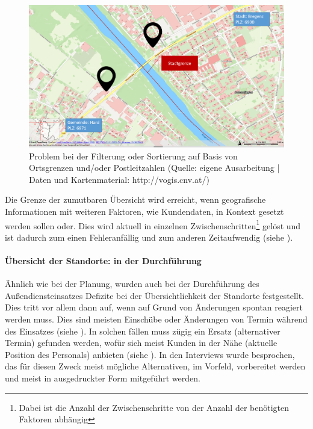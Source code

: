 \documentclass[Bachelorarbeit.tex]{subfiles}
\begin{document}
\begin{figure}[h]
\centering
\includegraphics[width=1\linewidth]{img/Interviews/HarteGrenzen}
\caption[Probleme mit harten Grenzen]{Problem bei der Filterung oder Sortierung auf Basis von Ortsgrenzen und/oder Postleitzahlen (Quelle: eigene Ausarbeitung | Daten und Kartenmaterial: http://vogis.cnv.at/)}
\label{fig:HarteGrenzen}
\end{figure}

Die Grenze der zumutbaren Übersicht wird erreicht, wenn geografische Informationen mit weiteren Faktoren, wie Kundendaten, in Kontext gesetzt werden sollen oder. 
Dies wird aktuell in einzelnen Zwischenschritten\footnote{Dabei ist die Anzahl der Zwischenschritte von der Anzahl der benötigten Faktoren abhängig} gelöst und ist dadurch zum einen Fehleranfällig und zum anderen Zeitaufwendig (siehe ).

\paragraph{Übersicht der Standorte: in der Durchführung}
Ähnlich wie bei der Planung, wurden auch bei der Durchführung des Außendiensteinsatzes Defizite bei der Übersichtlichkeit der Standorte festgestellt. 
Dies tritt vor allem dann auf, wenn auf Grund von Änderungen spontan reagiert werden muss.
Dies sind meisten Einschübe oder Änderungen von Termin während des Einsatzes (siehe ). 
In solchen fällen muss zügig ein Ersatz (alternativer Termin) gefunden werden, wofür sich meist Kunden in der Nähe (aktuelle Position des Personals) anbieten (siehe ).
In den Interviews wurde besprochen, das für diesen Zweck meist mögliche Alternativen, im Vorfeld, vorbereitet werden und meist in ausgedruckter Form mitgeführt werden. 
\end{document}
